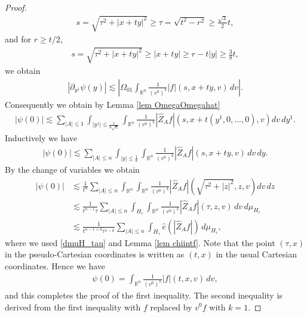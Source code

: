 \documentclass{article}
\newcommand{\bbr}{{\mathbb R}}
\newcommand{\bbrn}{{\bbr^n}}
\begin{document}
\begin{proof}
\begin{align}
s = \sqrt{ \tau^2 + | x + t y |^2 } \geq \tau = \sqrt{ t^2 - r^2 } \geq \frac{ \sqrt{ 3 } }{ 2 } t , \label{st1}
\end{align}
and for $ r \geq t / 2 $,
\begin{align}
s = \sqrt{ \tau^2 + | x + t y |^2 } \geq | x + t y | \geq r - t | y | \geq \frac38 t , \label{st2}
\end{align}
we obtain
\begin{align*}
| \partial_{ y^1 } \psi ( y ) | \lesssim \left| \Omega_{ 0 1 } \int_\bbrn \frac{ 1 }{ ( v^0 )^k } | f | ( s , x + t y , v ) \, d v \right| .
\end{align*}
Consequently we obtain by Lemma \ref{lem OmegaOmegahat}
\begin{align*}
| \psi ( 0 ) | \lesssim \sum_{ | A | \leq 1 } \int_{ | y^1 | \leq \frac{ 1 }{ 8 \sqrt{ n } } } \int_\bbrn \frac{ 1 }{ ( v^0 )^k } | \hat{ Z }_A f | \left( s , x + t ( y^1 , 0 , \dots , 0 ) , v \right) d v \, d y^1 .
\end{align*}
Inductively we have
\begin{align*}
| \psi ( 0 ) | \lesssim \sum_{ | A | \leq n } \int_{ | y | \leq \frac18 } \int_\bbrn \frac{ 1 }{ ( v^0 )^k } | \hat{ Z }_A f | ( s , x + t y , v ) \, d v \, d y .
\end{align*}
By the change of variables we obtain
\begin{align*}
| \psi ( 0 ) | & \lesssim \frac{ 1 }{ t^n } \sum_{ | A | \leq n } \int_\bbrn \int_\bbrn \frac{ 1 }{ ( v^0 )^k } | \hat{ Z }_A f | \left( \sqrt{ \tau^2 + | z |^2 } , z , v \right) d v \, d z \\
& \lesssim \frac{ 1 }{ t^{ n - 1 } \tau } \sum_{ | A | \leq n } \int_{ H_\tau } \int_\bbrn \frac{ 1 }{ ( v^0 )^k } | \hat{ Z }_A f | ( \tau , z , v ) \, d v \, d \mu_{ H_\tau } \\
& \lesssim \frac{ 1 }{ t^{ n - 1 + k } \tau^{ 1 - k } } \sum_{ | A | \leq n } \int_{ H_\tau } \hat{ e } ( | \hat{ Z }_A f | ) \, d \mu_{ H_\tau } ,
\end{align*}
where we used \eqref{dmuH_tau} and Lemma \ref{lem chiintf}. Note that the point $ ( \tau , x ) $ in the pseudo-Cartesian coordinates is written as $ ( t , x ) $ in the usual Cartesian coordinates. Hence we have
\begin{align*}
\psi ( 0 ) = \int_\bbrn \frac{ 1 }{ ( v^0 )^k } | f | ( t , x , v ) \, d v ,
\end{align*}
and this completes the proof of the first inequality. The second inequality is derived from the first inequality with $ f $ replaced by $ v^0 f $ with $ k = 1 $.
\end{proof}
\end{document}

